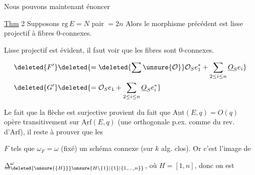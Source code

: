 
Nous pouvons maintenant énoncer

\uline{Thm} 2 Supposons $\mathrm{rg}\,E=N$ pair $=2n$  Alors le morphisme précédent est lisse projectif à fibres  $0$-connexes.

Lisse projectif est évident, il faut voir que les fibres  sont $0$-connexes.


\[
\begin{aligned}
\deleted{F'}&\deleted{=\deleted{\sum\unsure{\mathcal O}}\mathcal O_S e_1^*+\sum_{2\leq i\leq n}\underline O_S e_i}\\
\deleted{G'}&\deleted{=\mathcal O_S e_1+\sum_{2\leq i\leq n}\underline O_S e_i^*}
\end{aligned}
\]

Le fait que la flèche est surjective provient du fait que $\underline{\mathrm{Aut}}(E,q)=O(q)$ opère transitivement sur $\underline{\mathrm{Arf}}(E,q)$ (une  orthogonale p.ex.   comme   du rev. d'Arf), il reste à prouver que les

  $F$ tels que $\omega_F=\omega$ (fixé)   un schéma connexe (sur $k$ alg. clos). Or c'est l'image de

$\underline\Delta_{\deleted{\unsure{\{H\}}}\unsure{H\setminus\{1\}|\{1\}|\{1,\ldots,n\}}}^{\omega}$, où $H=[1,n]$, donc on est

